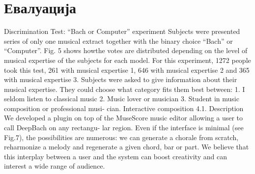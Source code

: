 \chapter{Евалуација}

\cite{Hadjeres2016} Discrimination Test: “Bach or Computer” experiment
Subjects were presented series of only one musical extract together with the binary choice “Bach” or “Computer”. Fig. 5 shows howthe votes are distributed depending on the level of musical expertise of the subjects for each model. For this experiment, 1272 people took this test, 261 with musical expertise 1, 646 with musical expertise 2 and 365 with musical expertise 3.
Subjects were asked to give information about their musical expertise. They could choose what category fits them best between:
1. I seldom listen to classical music
2. Music lover or musician
3. Student in music composition or professional musi- cian.
Interactive composition 4.1. Description
We developed a plugin on top of the MuseScore music editor allowing a user to call DeepBach on any rectangu- lar region. Even if the interface is minimal (see Fig.7), the possibilities are numerous: we can generate a chorale from scratch, reharmonize a melody and regenerate a given chord, bar or part. We believe that this interplay between a user and the system can boost creativity and can interest a wide range of audience.

